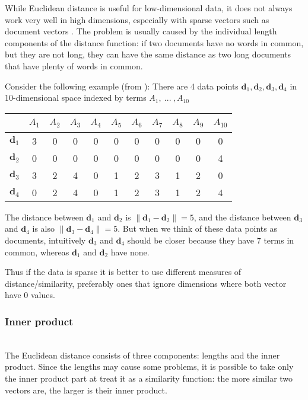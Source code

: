 While Euclidean distance is useful for low-dimensional data,
it does not always work very well in high dimensions, especially
with sparse vectors such as document vectors \cite{ertoz2003finding}.
The problem is usually caused by the individual length components of
the distance function: if two documents have no words in common,
but they are not long, they can have the same distance as two long
documents that have plenty of words in common.

Consider the following example (from \cite{ertoz2003finding}):
There are 4 data points $\mathbf d_1, \mathbf d_2, \mathbf d_3, \mathbf d_4$
in 10-dimensional space indexed by terms $A_1, \ ... \ , A_{10}$

\begin{center}
\begin{tabular}{|c|cccccccccc|}
  \hline
~ &  $A_1$ &   $A_2$ &   $A_3$ &  $A_4$ &  $A_5$ &  $A_6$ &  $A_7$ &  $A_8$ &  $A_9$ &  $A_{10}$ \\
  \hline
$\mathbf d_1$ &  3 &  0 &  0 &  0 &  0 &  0 &  0 &  0 &  0 &  0 \\
$\mathbf d_2$ &  0 &  0 &  0 &  0 &  0 &  0 &  0 &  0 &  0 &  4 \\
  \hline
$\mathbf d_3$ &  3 &  2 &  4 &  0 &  1 &  2 &  3 &  1 &  2 &  0 \\
$\mathbf d_4$ &  0 &  2 &  4 &  0 &  1 &  2 &  3 &  1 &  2 &  4 \\
  \hline
\end{tabular}
\end{center}

The distance between $\mathbf d_1$ and $\mathbf d_2$ is
$\| \mathbf d_1 - \mathbf d_2\| = 5$, and the distance between
$\mathbf d_3$ and $\mathbf d_4$ is also $\| \mathbf d_3 - \mathbf d_4\| = 5$.
But when we think of these data points as documents, intuitively
$\mathbf d_3$ and $\mathbf d_4$ should be closer because they
have 7 terms in common, whereas $\mathbf d_1$ and $\mathbf d_2$ have none.

Thus if the data is sparse it is better to use different measures
of distance/similarity, preferably ones that ignore dimensions
where both vector have 0 values.


\subsubsection{Inner product} \ \\

The Euclidean distance consists of three components: lengths and the inner product.
Since the lengths may cause some problems, it is possible to take only
the inner product part at treat it as a similarity function:
the more similar two vectors are, the larger is their inner product.

